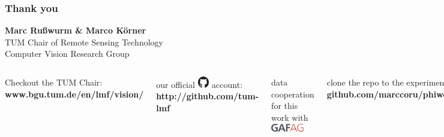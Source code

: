 \documentclass[%
  aspectratio=169,
  9pt,
  english,
  light,
  mathserif,
  professionalfont,
  affiliationintitlepagehead,
  titlegraphic,
   affiliation,
]{beamer}
\begin{document}
\begin{frame}
	\frametitle{Thank you}
	
	{\Large\centering 
		\textbf{Marc Rußwurm \& Marco Körner} \\
	
		TUM Chair of Remote Sensing Technology \\
		
		\centering Computer Vision Research Group \\
	}
	
	\vspace{2em}
	\Large 
	\begin{columns}[t]
		Checkout the TUM Chair: \textbf{www.bgu.tum.de/en/lmf/vision/}
		\vspace{1em}
		
		our official \includegraphics[width=5mm]{images/github} account: \textbf{http://github.com/tum-lmf}
		\vspace{1em}
		
		data cooperation for this work with \includegraphics[height=1em]{images/GAF_logo}
		
		clone the repo to the experiments! 
		{\textbf{github.com/marccoru/phiweek19}}
		
		\vspace{1em}
		\includegraphics[height=5mm]{images/twitter} follow \textbf{@marccoru} for updates.
		
		\vspace{1em}
		\includegraphics[height=5mm]{images/github} \textbf{github.com/marccoru} for code.
		
	\end{columns}

	
	
\end{frame}



\end{document}
